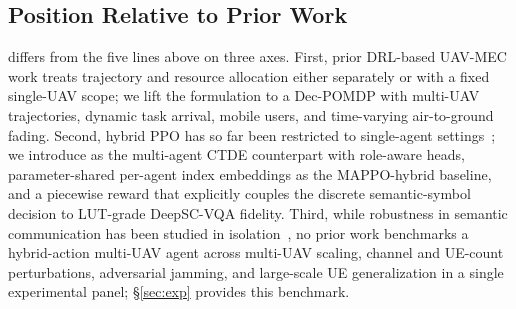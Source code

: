 \subsection{Position Relative to Prior Work}\label{subsec:rw:position}
\method differs from the five lines above on three axes. First, prior
DRL-based UAV-MEC work
\cite{zhang2023drlsemantic,hu2025ratesplitting,liu2024jamminguav} treats
trajectory and resource allocation either separately or with a fixed
single-UAV scope; we lift the formulation to a Dec-POMDP with
multi-UAV trajectories, dynamic task arrival, mobile users, and
time-varying air-to-ground fading. Second, hybrid PPO has so far been
restricted to single-agent
settings~\cite{xiong2018pdqn,bester2019mpdqn,hausknecht2016paddpg}; we
introduce \method as the multi-agent CTDE counterpart with role-aware
heads, parameter-shared per-agent index embeddings as the MAPPO-hybrid
baseline, and a piecewise reward that explicitly couples the discrete
semantic-symbol decision to LUT-grade DeepSC-VQA fidelity. Third, while
robustness in semantic communication has been studied in
isolation~\cite{liu2024jamminguav,pinto2017robustrl}, no prior work
benchmarks a hybrid-action multi-UAV agent across multi-UAV scaling,
channel and UE-count perturbations, adversarial jamming, and large-scale
UE generalization in a single experimental panel; \S\ref{sec:exp}
provides this benchmark.
